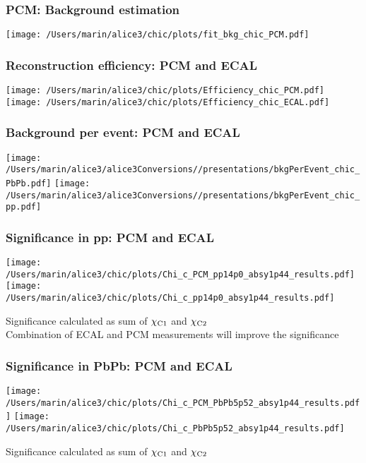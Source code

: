 \documentclass[final,hyperref={pdfpagelabels=false},aspectratio=169,t]{beamer}
\begin{document}
\begin{frame}
\frametitle{PCM: Background estimation} 
\centering
\texttt{[image: /Users/marin/alice3/chic/plots/fit\_bkg\_chic\_PCM.pdf]}
\end{frame}






\begin{frame}
\frametitle{Reconstruction efficiency: PCM and ECAL} 
\texttt{[image: /Users/marin/alice3/chic/plots/Efficiency\_chic\_PCM.pdf]}
\texttt{[image: /Users/marin/alice3/chic/plots/Efficiency\_chic\_ECAL.pdf]}

\end{frame}


\begin{frame}
\frametitle{Background per event: PCM and ECAL} 

\texttt{[image: /Users/marin/alice3/alice3Conversions//presentations/bkgPerEvent\_chic\_PbPb.pdf]}
\texttt{[image: /Users/marin/alice3/alice3Conversions//presentations/bkgPerEvent\_chic\_pp.pdf]}
\end{frame}


\begin{frame}
\frametitle{Significance in pp: PCM and ECAL} 
\texttt{[image: /Users/marin/alice3/chic/plots/Chi\_c\_PCM\_pp14p0\_absy1p44\_results.pdf]}
\texttt{[image: /Users/marin/alice3/chic/plots/Chi\_c\_pp14p0\_absy1p44\_results.pdf]}

Significance calculated as sum of $\chi_{\rm C1}$ and $\chi_{\rm C2}$\\
Combination of ECAL and PCM measurements will improve the significance

\end{frame}

\begin{frame}
\frametitle{Significance in PbPb: PCM and ECAL} 
\texttt{[image: /Users/marin/alice3/chic/plots/Chi\_c\_PCM\_PbPb5p52\_absy1p44\_results.pdf]}
\texttt{[image: /Users/marin/alice3/chic/plots/Chi\_c\_PbPb5p52\_absy1p44\_results.pdf]}

Significance calculated as sum of $\chi_{\rm C1}$ and $\chi_{\rm C2}$\\
\end{frame}
\end{document}

